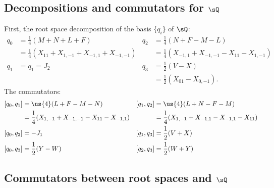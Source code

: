 \subsection{Decompositions and commutators for \texorpdfstring{$\sQ$}{Q}}

First, the root space decomposition of the basis $\{q_i\}$ of $\sQ$:
\begin{subequations}
	\begin{align}
		q_0 & =\frac{1}{ 4 }(M+N+L+F)                            & q_2 & =\frac{1}{ 4 }(N+F-M-L)                            \\
		    & =\frac{1}{ 4 }(X_{11}+X_{1,-1}+X_{-1,1}+X_{-1,-1}) &     & =\frac{1}{ 4 }(X_{-1,1}+X_{-1,-1}-X_{11}-X_{1,-1}) \\
		q_1 & =q_1=J_2                                           & q_3 & =\frac{1}{2}(V-X)                                  \\
		    &                                                    &     & =\frac{ 1 }{2}(X_{01}-X_{0,-1}).
	\end{align}
\end{subequations}
The commutators:
\begin{subequations}
	\begin{align}
		[q_0,q_1] & =\us{4}(L+F-M-N)                                   & [q_1,q_2] & =\us{4}(L+N-F-M)                                  \\\
		          & =\frac{1}{ 4 }(X_{1,-1}+X_{-1,-1}-X_{11}-X_{-1,1}) &           & =\frac{1}{ 4 }(X_{1,-1}+X_{-1,1}-X_{-1,1}-X_{11}) \\
		[q_0,q_2] & =-J_1                                              & [q_1,q_3] & =\frac{1}{2}(V+X)                                 \\
		[q_0,q_3] & =\frac{1}{2}(Y-W)                                  & [q_2,q_3] & =\frac{1}{2}(W+Y)
	\end{align}
\end{subequations}

\subsection{Commutators between root spaces and \texorpdfstring{$\sQ$}{Q}}

